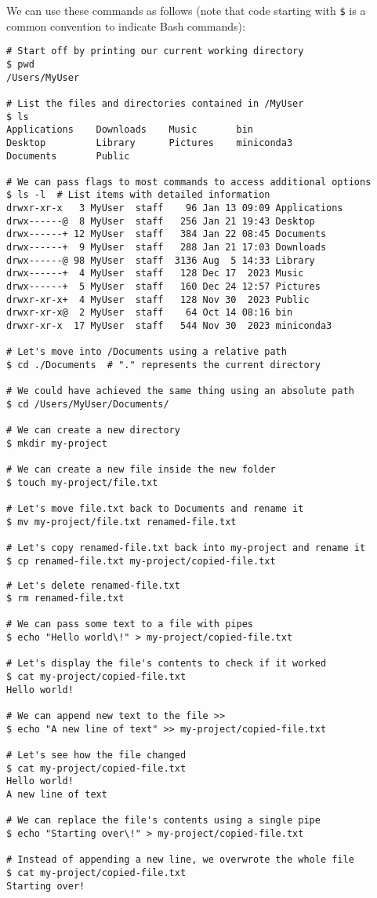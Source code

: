 \documentclass[12pt]{article}
\begin{document}
\pagebreak
We can use these commands as follows (note that code starting with
\texttt{\$} is a common convention to indicate Bash commands):

\begin{verbatim}
# Start off by printing our current working directory
$ pwd
/Users/MyUser

# List the files and directories contained in /MyUser
$ ls
Applications    Downloads    Music       bin
Desktop         Library      Pictures    miniconda3
Documents       Public

# We can pass flags to most commands to access additional options
$ ls -l  # List items with detailed information
drwxr-xr-x   3 MyUser  staff    96 Jan 13 09:09 Applications
drwx------@  8 MyUser  staff   256 Jan 21 19:43 Desktop
drwx------+ 12 MyUser  staff   384 Jan 22 08:45 Documents
drwx------+  9 MyUser  staff   288 Jan 21 17:03 Downloads
drwx------@ 98 MyUser  staff  3136 Aug  5 14:33 Library
drwx------+  4 MyUser  staff   128 Dec 17  2023 Music
drwx------+  5 MyUser  staff   160 Dec 24 12:57 Pictures
drwxr-xr-x+  4 MyUser  staff   128 Nov 30  2023 Public
drwxr-xr-x@  2 MyUser  staff    64 Oct 14 08:16 bin
drwxr-xr-x  17 MyUser  staff   544 Nov 30  2023 miniconda3

# Let's move into /Documents using a relative path
$ cd ./Documents  # "." represents the current directory

# We could have achieved the same thing using an absolute path
$ cd /Users/MyUser/Documents/

# We can create a new directory
$ mkdir my-project

# We can create a new file inside the new folder
$ touch my-project/file.txt

# Let's move file.txt back to Documents and rename it
$ mv my-project/file.txt renamed-file.txt

# Let's copy renamed-file.txt back into my-project and rename it
$ cp renamed-file.txt my-project/copied-file.txt
\end{verbatim}

\pagebreak
\begin{verbatim}
# Let's delete renamed-file.txt
$ rm renamed-file.txt

# We can pass some text to a file with pipes
$ echo "Hello world\!" > my-project/copied-file.txt

# Let's display the file's contents to check if it worked
$ cat my-project/copied-file.txt
Hello world!

# We can append new text to the file >>
$ echo "A new line of text" >> my-project/copied-file.txt

# Let's see how the file changed
$ cat my-project/copied-file.txt
Hello world!
A new line of text

# We can replace the file's contents using a single pipe
$ echo "Starting over\!" > my-project/copied-file.txt

# Instead of appending a new line, we overwrote the whole file
$ cat my-project/copied-file.txt
Starting over!
\end{verbatim}

\end{document}

